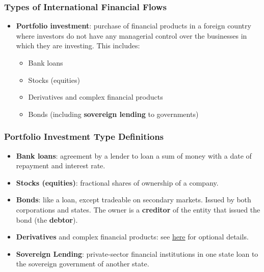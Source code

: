 \documentclass[handout]{beamer}
\begin{document}
\begin{frame} 
	\frametitle{\LARGE{Types of International Financial Flows}}
	\begin{itemize}
			\item \textbf{Portfolio investment}: purchase of financial products in a foreign country where investors do not have any managerial control over the businesses in which they are investing. This includes: \pause 
			\begin{itemize}
			    \item Bank loans \pause 
			    \item Stocks (equities) \pause
			    \item Derivatives and complex financial products \pause 
			    \item Bonds (including \textbf{sovereign lending} to governments)   
			 \end{itemize}
	\end{itemize}
\end{frame}

\begin{frame} 
	\frametitle{\LARGE{Portfolio Investment Type Definitions}}
	\begin{itemize}
		\item \textbf{Bank loans}: agreement by a lender to loan a sum of money with a date of repayment and interest rate. \pause 
		\item \textbf{Stocks (equities)}: fractional shares of ownership of a company. \pause
		\item \textbf{Bonds}: like a loan, except tradeable on secondary markets. Issued by both corporations and states. The owner is a \textbf{creditor} of the entity that issued the bond (the \textbf{debtor}). \pause  
		\item \textbf{Derivatives} and complex financial products: see \href{https://www.investopedia.com/terms/d/derivative.asp}{here} for optional details. 
	 	\item \textbf{Sovereign Lending}: private-sector financial institutions in one state loan to the sovereign government of another state. 
	\end{itemize}
\end{frame}
\end{document}

